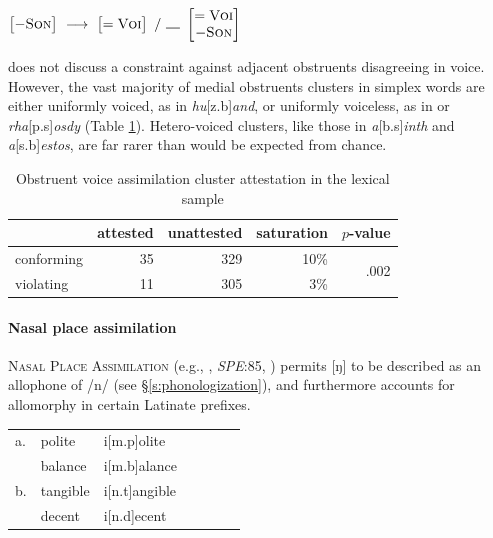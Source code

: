 \begin{example}
\label{ovarule}
$\begin{bmatrix} -\textsc{Son} \end{bmatrix}~\goesto~\begin{bmatrix} =\textsc{Voi} \end{bmatrix}~/~\gap~\begin{bmatrix} =\textsc{Voi} \\ -\textsc{Son} \end{bmatrix}$
\end{example}

\noindent
\citet{Pierrehumbert1994} does not discuss a constraint against adjacent obstruents disagreeing in voice. 
However, the vast majority of medial obstruents clusters in simplex words are either uniformly voiced, as in \emph{hu}[z.b]\emph{and}, or uniformly voiceless, as in or \emph{rha}[p.s]\emph{osdy} (Table \ref{ovatab}).
Hetero-voiced clusters, like those in \emph{a}[b.s]\emph{inth} and \emph{a}[s.b]\emph{estos}, are far rarer than would be expected from chance.

\begin{table}
\centering
\begin{tabular}{l rrrr}
\toprule
           & attested & unattested & saturation & $p$-value \\
\midrule
conforming & 35       & 329        & 10\%       & \multirow{2}{*}{.002} \\
violating  & 11       & 305        &  3\%       \\
\bottomrule
\end{tabular}
\caption{Obstruent voice assimilation cluster attestation in the lexical sample}
\label{ovatab}
\end{table}

\paragraph{Nasal place assimilation}
\label{npa}

\textsc{Nasal Place Assimilation} (e.g., \citealt[65f.]{Borowsky1986}, \emph{SPE}:85, \citealt[62]{Halle1985a})
permits [ŋ] to be described as an allophone of /n/ (see \S\ref{s:phonologization}), and furthermore accounts for allomorphy in certain Latinate prefixes.

\begin{example}
\label{nparule}
\begin{tabular}{l l l l l l l}
a. & {polite}   & {i}[m.p]{olite}   \\
   & {balance}  & {i}[m.b]{alance}  \\
b. & {tangible} & {i}[n.t]{angible} \\
   & {decent}   & {i}[n.d]{ecent}   \\
\end{tabular}
\end{example}

